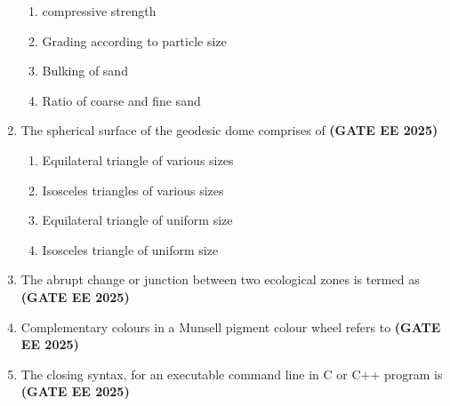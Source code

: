 \documentclass[journal,12pt,onecolumn]{IEEEtran}
\theoremstyle{remark}
\begin{document}
\begin{enumerate}
\begin{enumerate}
    \item compressive strength
    \item Grading according to particle size
    \item Bulking of sand
    \item Ratio of coarse and fine sand
\end{enumerate}
\item The spherical surface of the geodesic dome comprises of \hfill \textbf{(GATE EE 2025)}
\begin{enumerate}
    \item Equilateral triangle of various sizes
    \item Isosceles triangles of various sizes
    \item Equilateral triangle of uniform size
    \item Isosceles triangle of uniform size
\end{enumerate}
\item The abrupt change or junction between two ecological zones is termed as \hfill \textbf{(GATE EE 2025)}
\begin{enumerate}
\end{enumerate}
\item Complementary colours in a Munsell pigment colour wheel refers to \hfill \textbf{(GATE EE 2025)}
\begin{enumerate}
\end{enumerate}
\item The closing syntax, for an executable command line in C or C++ program is \hfill \textbf{(GATE EE 2025)}
\begin{enumerate}
    \begin{multicols}{4}

\end{multicols}
\end{enumerate}
\end{enumerate}
\end{document}

